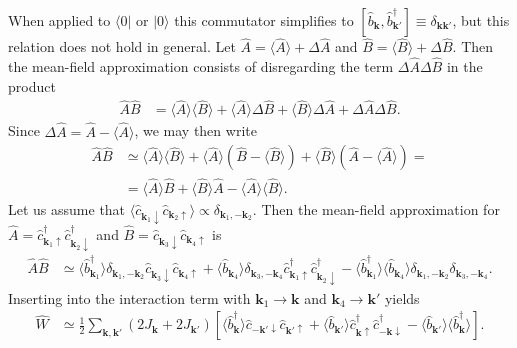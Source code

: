 \documentclass[english, parskip=full]{scrartcl}
\renewcommand{\bra}{}
\newcommand{\kla}{}
\newcommand{\klam}{}
\newcommand{\Bra}{}
\newcommand{\Ket}{}
\begin{document}
When applied to $\Bra\langle 0 |$ or $\Ket | 0 \rangle$ this commutator simplifies to $\left[ \hat{b}_{\mathbf{k}}, \hat{b}_{\mathbf{k}'}^\dagger \right] \equiv  \delta_{\mathbf{k}\mathbf{k}'}$, but this relation does not hold in general.
Let $\hat{A} = \bra\langle \hat{A} \rangle + \Delta\hat{A}$ and $\hat{B} = \bra\langle \hat{B} \rangle + \Delta\hat{B}$. 
Then the mean-field approximation consists of disregarding the term $\Delta\hat{A}\Delta\hat{B}$ in the product
\begin{align}
\hat{A}\hat{B} &= \bra\langle \hat{A} \rangle\bra\langle \hat{B} \rangle + \bra\langle \hat{A} \rangle\Delta\hat{B} + \bra\langle \hat{B} \rangle\Delta\hat{A} + \Delta\hat{A}\Delta\hat{B}.
\end{align}
Since $\Delta\hat{A} = \hat{A} - \bra\langle \hat{A} \rangle$, we may then write
\begin{align}
\hat{A}\hat{B} &\simeq \bra\langle \hat{A} \rangle\bra\langle \hat{B} \rangle + \bra\langle \hat{A} \rangle \kla\left( \hat{B} - \bra\langle \hat{B} \rangle \right) + \bra\langle \hat{B} \rangle\kla\left( \hat{A} - \bra\langle \hat{A} \rangle \right) = \\
&= \bra\langle \hat{A} \rangle\hat{B} + \bra\langle \hat{B} \rangle\hat{A} - \bra\langle \hat{A} \rangle\bra\langle \hat{B} \rangle.
\end{align}
Let us assume that $\bra\langle \hat{c}_{\textbf{k}_1\downarrow} \hat{c}_{\textbf{k}_2\uparrow} \rangle \propto \delta_{\textbf{k}_1, -\textbf{k}_2}$.
Then the mean-field approximation for $\hat{A} = \hat{c}_{\textbf{k}_1\uparrow}^\dagger \hat{c}_{\textbf{k}_2\downarrow}^\dagger$ and $\hat{B} = \hat{c}_{\textbf{k}_3\downarrow} \hat{c}_{\textbf{k}_4\uparrow}$ is
\begin{align}
\hat{A}\hat{B} &\simeq \bra\langle {\hat{b}_{\textbf{k}_1}^\dagger }\rangle \delta_{\textbf{k}_1,- \textbf{k}_2} \hat{c}_{\textbf{k}_3\downarrow} \hat{c}_{\textbf{k}_4\uparrow} + \bra\langle {\hat{b}_{\textbf{k}_4} }\rangle  \delta_{\textbf{k}_3,- \textbf{k}_4} \hat{c}_{\textbf{k}_1\uparrow}^\dagger \hat{c}_{\textbf{k}_2\downarrow}^\dagger - \bra\langle {\hat{b}_{\textbf{k}_1}^\dagger }\rangle \bra\langle {\hat{b}_{\textbf{k}_4}  }\rangle  \delta_{\textbf{k}_1,- \textbf{k}_2} \delta_{\textbf{k}_3,- \textbf{k}_4}.
\end{align}
Inserting into the interaction term with $\textbf{k}_1 \rightarrow \textbf{k}$ and $\textbf{k}_4 \rightarrow \textbf{k}'$ yields
\begin{align}
\hat{W} &\simeq \frac{1}{2} \sum_{\textbf{k}, \textbf{k}'} \kla\left( {2J_{\textbf{k}} + 2J_{\textbf{k}'} } \right) \klam\left[ \langle \hat{b}_{\textbf{k}}^\dagger  \rangle \hat{c}_{-\mathbf{k}'\downarrow} \hat{c}_{\mathbf{k}'\uparrow} + \bra\langle \hat{b}_{\textbf{k}'} \rangle \hat{c}_{\mathbf{k}\uparrow}^\dagger \hat{c}_{-\mathbf{k}\downarrow}^\dagger  - \bra\langle \hat{b}_{\mathbf{k}'} \rangle\bra\langle \hat{b}_{\mathbf{k}}^\dagger \rangle \right].
\end{align}
\end{document}

